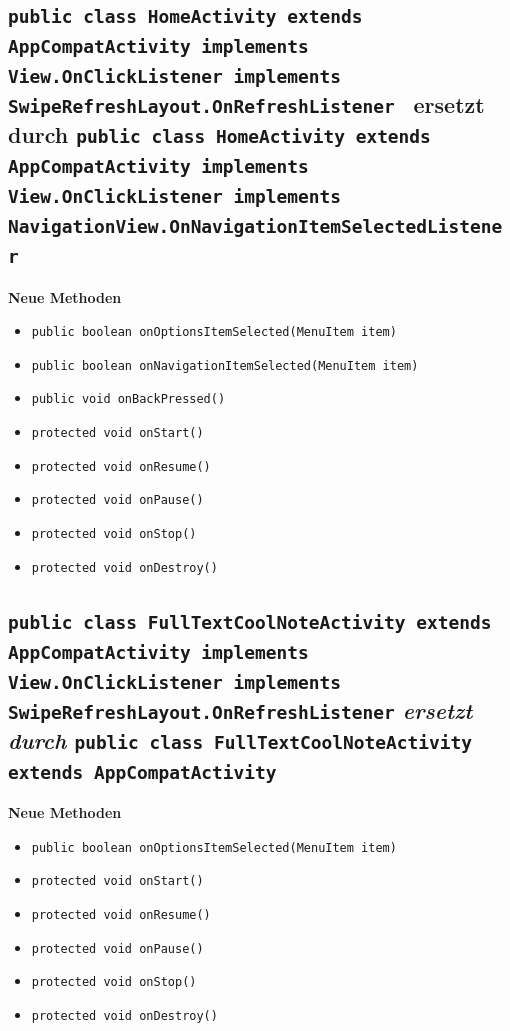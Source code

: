 \documentclass[a4paper]{scrreprt}
\begin{document}
		\subsection{\texttt{public class HomeActivity extends AppCompatActivity implements View.OnClickListener implements SwipeRefreshLayout.OnRefreshListener } ersetzt durch \texttt{public class HomeActivity extends AppCompatActivity implements View.OnClickListener implements NavigationView.OnNavigationItemSelectedListener }}
			\textbf{Neue Methoden}
			\begin{itemize}
				\item \texttt{public boolean onOptionsItemSelected(MenuItem item)}
				\item \texttt{public boolean onNavigationItemSelected(MenuItem item)}
				\item \texttt{public void onBackPressed()}
				\item \texttt{protected void onStart()}
				\item \texttt{protected void onResume()}
				\item \texttt{protected void onPause()}
				\item \texttt{protected void onStop()}
				\item \texttt{protected void onDestroy()}
			\end{itemize}
		\subsection{\texttt{public class FullTextCoolNoteActivity extends AppCompatActivity implements View.OnClickListener implements SwipeRefreshLayout.OnRefreshListener} \textit{ersetzt durch} \texttt{public class FullTextCoolNoteActivity extends AppCompatActivity}}
			\textbf{Neue Methoden}
			\begin{itemize}
				\item \texttt{public boolean onOptionsItemSelected(MenuItem item)}
				\item \texttt{protected void onStart()}
				\item \texttt{protected void onResume()}
				\item \texttt{protected void onPause()}
				\item \texttt{protected void onStop()}
				\item \texttt{protected void onDestroy()}
			\end{itemize}
\end{document}
